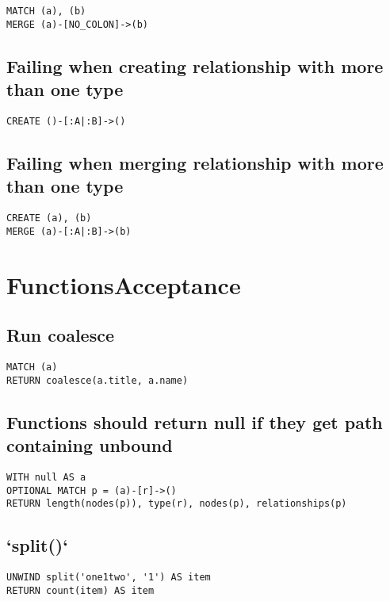 \begin{lstlisting}
MATCH (a), (b)
MERGE (a)-[NO_COLON]->(b)
\end{lstlisting}

\subsection{Failing when creating relationship with more than one type}

\begin{lstlisting}
CREATE ()-[:A|:B]->()
\end{lstlisting}

\subsection{Failing when merging relationship with more than one type}

\begin{lstlisting}
CREATE (a), (b)
MERGE (a)-[:A|:B]->(b)
\end{lstlisting}
\section{FunctionsAcceptance}


\subsection{Run coalesce}

\begin{lstlisting}
MATCH (a)
RETURN coalesce(a.title, a.name)
\end{lstlisting}

\subsection{Functions should return null if they get path containing unbound}

\begin{lstlisting}
WITH null AS a
OPTIONAL MATCH p = (a)-[r]->()
RETURN length(nodes(p)), type(r), nodes(p), relationships(p)
\end{lstlisting}

\subsection{`split()`}

\begin{lstlisting}
UNWIND split('one1two', '1') AS item
RETURN count(item) AS item
\end{lstlisting}

